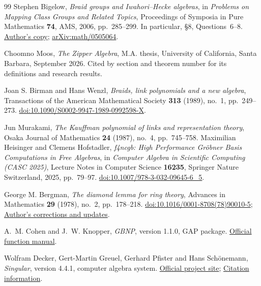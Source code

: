\documentclass[11pt]{article}
\begin{document}
\begin{thebibliography}{99}
Stephen Bigelow, \emph{Braid groups and Iwahori--Hecke algebras},
in \emph{Problems on Mapping Class Groups and Related Topics},
Proceedings of Symposia in Pure Mathematics \textbf{74}, AMS, 2006,
pp.~285--299. In particular, \S8, Questions~6--8.
\href{https://web.math.ucsb.edu/~bigelow/publications/10.pdf}{Author's copy};
\href{https://arxiv.org/abs/math/0505064}{arXiv:math/0505064}.

Choomno Moos, \emph{The Zipper Algebra}, M.A. thesis,
University of California, Santa Barbara, September 2026.
Cited by section and theorem number for its definitions and research results.

Joan S. Birman and Hans Wenzl, \emph{Braids, link polynomials and a new algebra},
Transactions of the American Mathematical Society \textbf{313} (1989),
no.~1, pp.~249--273.
\href{https://doi.org/10.1090/S0002-9947-1989-0992598-X}{doi:10.1090/S0002-9947-1989-0992598-X}.

Jun Murakami, \emph{The Kauffman polynomial of links and representation theory},
Osaka Journal of Mathematics \textbf{24} (1987), no.~4, pp.~745--758.
Maximilian Heisinger and Clemens Hofstadler,
\emph{f4ncgb: High Performance Gr\"obner Basis Computations in Free Algebras},
in \emph{Computer Algebra in Scientific Computing (CASC 2025)},
Lecture Notes in Computer Science \textbf{16235},
Springer Nature Switzerland, 2025, pp.~79--97.
\href{https://doi.org/10.1007/978-3-032-09645-6_5}{doi:10.1007/978-3-032-09645-6\_5}.

George M. Bergman, \emph{The diamond lemma for ring theory},
Advances in Mathematics \textbf{29} (1978), no.~2, pp.~178--218.
\href{https://doi.org/10.1016/0001-8708(78)90010-5}{doi:10.1016/0001-8708(78)90010-5};
\href{https://math.berkeley.edu/~gbergman/papers/updates/diamond.html}{Author's corrections and updates}.

A.~M. Cohen and J.~W. Knopper, \emph{GBNP}, version 1.1.0, GAP package.
\href{https://gap-packages.github.io/gbnp/doc/chap3.html}{Official function manual}.

Wolfram Decker, Gert-Martin Greuel, Gerhard Pfister and Hans Sch\"onemann,
\emph{Singular}, version 4.4.1, computer algebra system.
\href{https://www.singular.uni-kl.de/}{Official project site};
\href{https://www.singular.uni-kl.de/index.php/how-to-cite-singular}{Citation information}.


\end{thebibliography}
\end{document}
